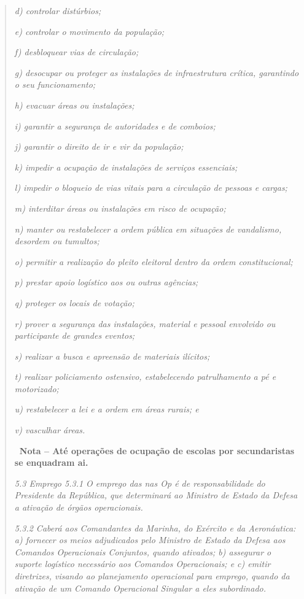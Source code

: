 \begin{quote}
\emph{d) controlar distúrbios;}

\emph{e) controlar o movimento da população;}

\emph{f) desbloquear vias de circulação;}

\emph{g) desocupar ou proteger as instalações de infraestrutura crítica,
garantindo o seu funcionamento;}

\emph{h) evacuar áreas ou instalações;}

\emph{i) garantir a segurança de autoridades e de comboios;}

\emph{j) garantir o direito de ir e vir da população;}

\emph{k) impedir a ocupação de instalações de serviços essenciais;}

\emph{l) impedir o bloqueio de vias vitais para a circulação de pessoas
e cargas;}

\emph{m) interditar áreas ou instalações em risco de ocupação;}

\emph{n) manter ou restabelecer a ordem pública em situações de
vandalismo, desordem ou tumultos;}

\emph{o) permitir a realização do pleito eleitoral dentro da ordem
constitucional;}

\emph{p) prestar apoio logístico aos  ou outras agências;}

\emph{q) proteger os locais de votação;}

\emph{r) prover a segurança das instalações, material e pessoal
envolvido ou participante de grandes eventos;}

\emph{s) realizar a busca e apreensão de materiais ilícitos;}

\emph{t) realizar policiamento ostensivo, estabelecendo patrulhamento a
pé e motorizado;}

\emph{u) restabelecer a lei e a ordem em áreas rurais; e}

\emph{v) vasculhar áreas.}

\textbf{~Nota -- Até operações de ocupação de escolas por secundaristas
se enquadram ai.}

\emph{5.3 Emprego 5.3.1 O emprego das  nas Op  é de
responsabilidade do Presidente da República, que determinará ao Ministro
de Estado da Defesa a ativação de órgãos operacionais.}

\emph{5.3.2 Caberá aos Comandantes da Marinha, do Exército e da
Aeronáutica: a) fornecer os meios adjudicados pelo Ministro de Estado da
Defesa aos Comandos Operacionais Conjuntos, quando ativados; b)
assegurar o suporte logístico necessário aos Comandos Operacionais; e c)
emitir diretrizes, visando ao planejamento operacional para emprego,
quando da ativação de um Comando Operacional Singular a eles
subordinado.}


\end{quote}
